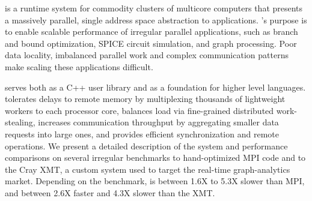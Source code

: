 \Grappa is a runtime system for commodity clusters of multicore computers that
presents a massively parallel, single address space abstraction to
applications. \Grappa's purpose is to enable scalable performance of irregular
parallel applications, such as  branch and bound optimization, SPICE circuit simulation, and graph processing. Poor data locality,
imbalanced parallel work and complex communication patterns make scaling these
applications difficult.

\Grappa serves both as a C++ user library and as a foundation for higher level
languages. \Grappa tolerates delays to remote memory by multiplexing thousands
of lightweight workers to each processor core, balances load via fine-grained
distributed work-stealing, increases communication throughput by aggregating
smaller data requests into large ones, and provides efficient synchronization
and remote operations. We present a detailed description of the \Grappa system
and performance comparisons on several irregular benchmarks to hand-optimized
MPI code and to the Cray XMT, a custom system used to target the real-time
graph-analytics market. Depending on the benchmark, \Grappa is between
1.6X to 5.3X slower than MPI, and between 2.6X faster
and 4.3X slower than the XMT.
